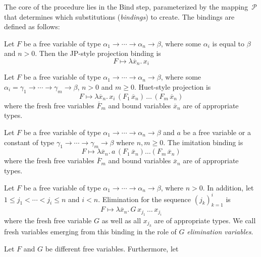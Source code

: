 %
%
The core of the procedure lies in the \textsf{Bind} step, parameterized
by the mapping~$\mathcal{P}$ that determines which substitutions (\emph{bindings}) 
to create. The bindings are defined as follows:
%
\begin{description}[itemsep=1\jot]
    \item[JP-style projection for $F$] Let $F$ be a free variable of
    type $\alpha_1 \rightarrow \cdots \rightarrow \alpha_n \rightarrow \beta$, where
    some $\alpha_i$ is equal to $\beta$ and $n > 0$. Then the JP-style projection binding is
        \[F \mapsto \lambda \overline{x}_n.\,x_i\]
    \item[Huet-style projection for $F$] Let $F$ be a free variable of type $\alpha_1
    \rightarrow \cdots \rightarrow \alpha_n \rightarrow \beta$, where some $\alpha_i
    = \gamma_1 \rightarrow \cdots \rightarrow \gamma_m \rightarrow \beta$, $n > 0$ and $m \geq 0$. Huet-style projection is
    \[F \mapsto \lambda \overline{x}_n. \, x_i \, (F_1 \, \overline{x}_n) \, \ldots \, (F_m \, \overline{x}_n)\]
    where the fresh free variables $\overline{F}_m$ and bound variables $\overline{x}_n$ are of appropriate types.
    \item[Imitation of $a$ for $F$] 
     Let $F$ be a free variable of type $\alpha_1 \rightarrow
    \cdots \rightarrow \alpha_n \rightarrow \beta$ and $a$ be a free variable or a constant
    of type $\gamma_1 \rightarrow \cdots
    \rightarrow \gamma_m \rightarrow \beta$ where $n,m \geq 0$. The imitation binding is
    \[F \mapsto \lambda \overline{x}_n. \, a \, (F_1 \, \overline{x}_n) \ldots
    (F_m \, \overline{x}_n)\] where the fresh free variables $\overline{F}_m $ and
    bound variables $\overline{x}_n$ are of appropriate types.
    \item[Elimination for $F$] Let $F$ be a free variable of type $\alpha_1 \rightarrow
    \cdots \rightarrow \alpha_n \rightarrow \beta$, where $n >0$. In addition, let $1 \leq j_1 < \cdots < j_i \leq n$ and $i<n$. Elimination
    for the sequence $(j_k)_{k=1}^i$ is
    \[ F \mapsto \lambda \overline{x}_n. \, G \, x_{j_1} \, \ldots \, x_{j_i}\]
    where the fresh free variable $G$ as well as all $x_{j_k}$ are of appropriate types.
    We call fresh variables emerging from this binding in the role of $G$ 
    \emph{elimination variables}.
    \item[Identification for $F$ and $G$] Let $F$ and $G$ be different free variables. Furthermore, let

\end{description}
